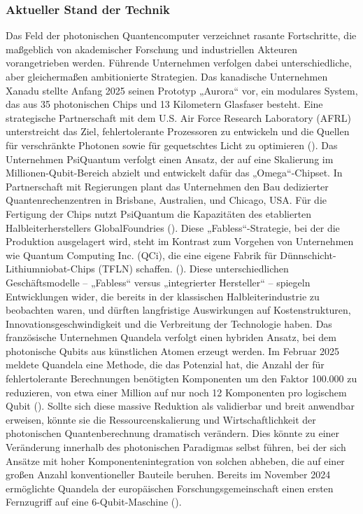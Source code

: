 \subsubsection{Aktueller Stand der Technik}
Das Feld der photonischen Quantencomputer verzeichnet rasante Fortschritte, die maßgeblich von akademischer Forschung und industriellen Akteuren vorangetrieben werden. Führende Unternehmen verfolgen dabei unterschiedliche, aber gleichermaßen ambitionierte Strategien.
Das kanadische Unternehmen Xanadu stellte Anfang 2025 seinen Prototyp „Aurora“ vor, ein modulares System, das aus 35 photonischen Chips und 13 Kilometern Glasfaser besteht. Eine strategische Partnerschaft mit dem U.S. Air Force Research Laboratory (AFRL) unterstreicht das Ziel, fehlertolerante Prozessoren zu entwickeln und die Quellen für verschränkte Photonen sowie für gequetschtes Licht zu optimieren (\cite{abdel-kareemXanaduUSAir2025}).
Das Unternehmen PsiQuantum verfolgt einen Ansatz, der auf eine Skalierung im Millionen-Qubit-Bereich abzielt und entwickelt dafür das „Omega“-Chipset. In Partnerschaft mit Regierungen plant das Unternehmen den Bau dedizierter Quantenrechenzentren in Brisbane, Australien, und Chicago, USA. Für die Fertigung der Chips nutzt PsiQuantum die Kapazitäten des etablierten Halbleiterherstellers GlobalFoundries (\cite{DARPAEyesCompanies}). Diese „Fabless“-Strategie, bei der die Produktion ausgelagert wird, steht im Kontrast zum Vorgehen von Unternehmen wie Quantum Computing Inc. (QCi), die eine eigene Fabrik für Dünnschicht-Lithiumniobat-Chips (TFLN) schaffen. (\cite{QuantumComputingInc}). Diese unterschiedlichen Geschäftsmodelle – „Fabless“ versus „integrierter Hersteller“ – spiegeln Entwicklungen wider, die bereits in der klassischen Halbleiterindustrie zu beobachten waren, und dürften langfristige Auswirkungen auf Kostenstrukturen, Innovationsgeschwindigkeit und die Verbreitung der Technologie haben. \newline
Das französische Unternehmen Quandela verfolgt einen hybriden Ansatz, bei dem photonische Qubits aus künstlichen Atomen erzeugt werden. Im Februar 2025 meldete Quandela eine Methode, die das Potenzial hat, die Anzahl der für fehlertolerante Berechnungen benötigten Komponenten um den Faktor 100.000 zu reduzieren, von etwa einer Million auf nur noch 12 Komponenten pro logischem Qubit (\cite{QuandelaAnnounces100000fold2025}). Sollte sich diese massive Reduktion als validierbar und breit anwendbar erweisen, könnte sie die Ressourcenskalierung und Wirtschaftlichkeit der photonischen Quantenberechnung dramatisch verändern. Dies könnte zu einer Veränderung innerhalb des photonischen Paradigmas selbst führen, bei der sich Ansätze mit hoher Komponentenintegration von solchen abheben, die auf einer großen Anzahl konventioneller Bauteile beruhen. Bereits im November 2024 ermöglichte Quandela der europäischen Forschungsgemeinschaft einen ersten Fernzugriff auf eine 6-Qubit-Maschine (\cite{QuandelaAnnounces100000fold2025}). \newline
